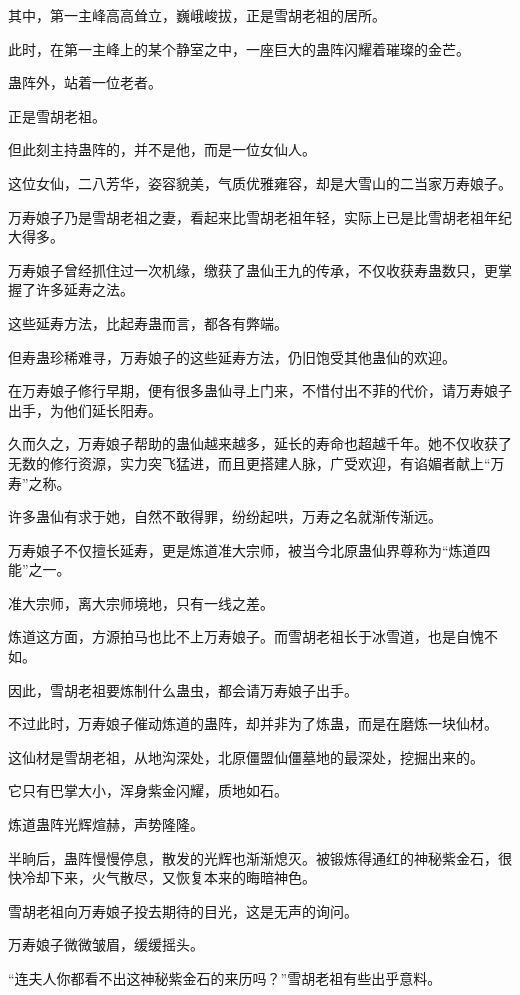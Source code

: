 \begin{this_body}
其中，第一主峰高高耸立，巍峨峻拔，正是雪胡老祖的居所。

此时，在第一主峰上的某个静室之中，一座巨大的蛊阵闪耀着璀璨的金芒。

蛊阵外，站着一位老者。

正是雪胡老祖。

但此刻主持蛊阵的，并不是他，而是一位女仙人。

这位女仙，二八芳华，姿容貌美，气质优雅雍容，却是大雪山的二当家万寿娘子。

万寿娘子乃是雪胡老祖之妻，看起来比雪胡老祖年轻，实际上已是比雪胡老祖年纪大得多。

万寿娘子曾经抓住过一次机缘，缴获了蛊仙王九的传承，不仅收获寿蛊数只，更掌握了许多延寿之法。

这些延寿方法，比起寿蛊而言，都各有弊端。

但寿蛊珍稀难寻，万寿娘子的这些延寿方法，仍旧饱受其他蛊仙的欢迎。

在万寿娘子修行早期，便有很多蛊仙寻上门来，不惜付出不菲的代价，请万寿娘子出手，为他们延长阳寿。

久而久之，万寿娘子帮助的蛊仙越来越多，延长的寿命也超越千年。她不仅收获了无数的修行资源，实力突飞猛进，而且更搭建人脉，广受欢迎，有谄媚者献上“万寿”之称。

许多蛊仙有求于她，自然不敢得罪，纷纷起哄，万寿之名就渐传渐远。

万寿娘子不仅擅长延寿，更是炼道准大宗师，被当今北原蛊仙界尊称为“炼道四能”之一。

准大宗师，离大宗师境地，只有一线之差。

炼道这方面，方源拍马也比不上万寿娘子。而雪胡老祖长于冰雪道，也是自愧不如。

因此，雪胡老祖要炼制什么蛊虫，都会请万寿娘子出手。

不过此时，万寿娘子催动炼道的蛊阵，却并非为了炼蛊，而是在磨炼一块仙材。

这仙材是雪胡老祖，从地沟深处，北原僵盟仙僵墓地的最深处，挖掘出来的。

它只有巴掌大小，浑身紫金闪耀，质地如石。

炼道蛊阵光辉煊赫，声势隆隆。

半晌后，蛊阵慢慢停息，散发的光辉也渐渐熄灭。被锻炼得通红的神秘紫金石，很快冷却下来，火气散尽，又恢复本来的晦暗神色。

雪胡老祖向万寿娘子投去期待的目光，这是无声的询问。

万寿娘子微微皱眉，缓缓摇头。

“连夫人你都看不出这神秘紫金石的来历吗？”雪胡老祖有些出乎意料。


\end{this_body}
